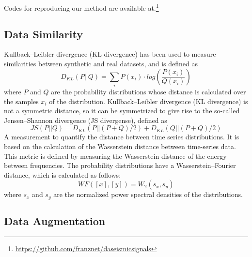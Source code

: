 \documentclass[journal]{IEEEtran}
\begin{document}
Codes for reproducing our method are available at.\footnote{\href{https://github.com/franznet/daseismicsignals}{\color{blue}https://github.com/franznet/daseismicsignals}}



\subsection{Data Similarity}
Kullback–Leibler divergence (KL divergence) has been used to measure similarities between synthetic and real datasets, and is defined as
$$D_{KL}(P||Q)=\sum_{i}P(x_i )\cdot log\left(\frac{P(x_i)}{Q(x_i)}\right)$$
where $P$ and $Q$ are the probability distributions whose distance is calculated over the samples $x_i$  of the distribution\cite{iglesias2023data}. Kullback–Leibler divergence (KL divergence) is not a symmetric distance, so it can be symmetrized to give rise to the so-called Jensen–Shannon divergence (JS divergense), defined as
$$JS(P||Q)=D_{KL} (P||(P+Q)/2) +D_{KL}(Q||(P+Q)/2)$$
A measurement to quantify the distance between time series distributions. It is based on the calculation of the Wasserstein distance between time-series data. This metric is defined by measuring the Wasserstein distance of the energy between frequencies. The probability distributions have a Wasserstein–Fourier distance, which is calculated as follows\cite{iglesias2023data}:
$$WF([x],[y])=W_2 (s_x,s_y)$$
where $s_x$ and $s_y$ are the normalized power spectral densities of the distributions.


\subsection{Data Augmentation}
\end{document}

